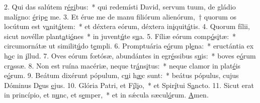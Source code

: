 2. Qui das salútem r\uline{é}g\uline{i}bus:~* qui redemísti David, servum tuum, de gládio malígno: \uline{é}rip\uline{e} me.
3. Et érue me de manu filiórum alienórum,~† quorum os locútum est v\uline{a}nit\uline{á}tem:~* et déxtera eórum, déxtera in\uline{i}quit\uline{á}tis.
4. Quorum fílii, sicut novéllæ plant\uline{a}ti\uline{ó}nes~* in juvent\uline{ú}te s\uline{u}a.
5. Fíliæ eórum comp\uline{ó}s\uline{i}tæ:~* circumornátæ ut similit\uline{ú}do t\uline{e}mpli.
6. Promptuária e\uline{ó}rum pl\uline{e}na:~* eructántia ex h\uline{o}c in \uline{i}llud.
7. Oves eórum fœtósæ, abundántes in egr\uline{é}ssibus s\uline{u}is:~* boves e\uline{ó}rum cr\uline{a}ssæ.
8. Non est ruína macériæ, neque tr\uline{á}ns\uline{i}tus:~* neque clamor in plat\uline{é}is e\uline{ó}rum.
9. Beátum dixérunt pópulum, c\uline{u}i h\uline{æ}c sunt:~* beátus pópulus, cujus Dóminus D\uline{e}us \uline{e}jus.
10. Glória Patri, et F\uline{í}l\uline{i}o,~* et Spir\uline{í}tui S\uline{a}ncto.
11. Sicut erat in princípio, et n\uline{u}nc, et s\uline{e}mper,~* et in sǽcula sæcul\uline{ó}rum. \uline{A}men.
